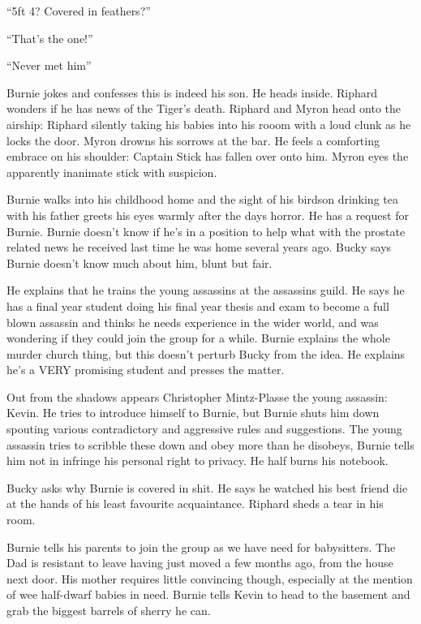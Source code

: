 “5ft 4? Covered in feathers?”\medskip

“That’s the one!”\medskip

“Never met him”\medskip

Burnie jokes and confesses this is indeed his son. He heads inside. Riphard wonders if he has news of the Tiger’s death. Riphard and Myron head onto the airship: Riphard silently taking his babies into his rooom with a loud clunk as he locks the door. Myron drowns his sorrows at the bar. He feels a comforting embrace on his shoulder: Captain Stick has fallen over onto him. Myron eyes the apparently inanimate stick with suspicion.\medskip

Burnie walks into his childhood home and the sight of his birdson drinking tea with his father greets his eyes warmly after the days horror. He has a request for Burnie. Burnie doesn’t know if he’s in a position to help what with the prostate related news he received last time he was home several years ago. Bucky says Burnie doesn’t know much about him, blunt but fair.\medskip

He explains that he trains the young assassins at the assassins guild. He says he has a final year student doing his final year thesis and exam to become a full blown assassin and thinks he needs experience in the wider world, and was wondering if they could join the group for a while. Burnie explains the whole murder church thing, but this doesn’t perturb Bucky from the idea. He explains he’s a VERY promising student and presses the matter.\medskip

Out from the shadows appears Christopher Mintz-Plasse the young assassin: Kevin. He tries to introduce himself to Burnie, but Burnie shuts him down spouting various contradictory and aggressive rules and suggestions. The young assassin tries to scribble these down and obey more than he disobeys, Burnie tells him not in infringe his personal right to privacy. He half burns his notebook.\medskip

Bucky asks why Burnie is covered in shit. He says he watched his best friend die at the hands of his least favourite acquaintance. Riphard sheds a tear in his room.\medskip

Burnie tells his parents to join the group as we have need for babysitters. The Dad is resistant to leave having just moved a few months ago, from the house next door. His mother requires little convincing though, especially at the mention of wee half-dwarf babies in need. Burnie tells Kevin to head to the basement and grab the biggest barrels of sherry he can.\medskip

